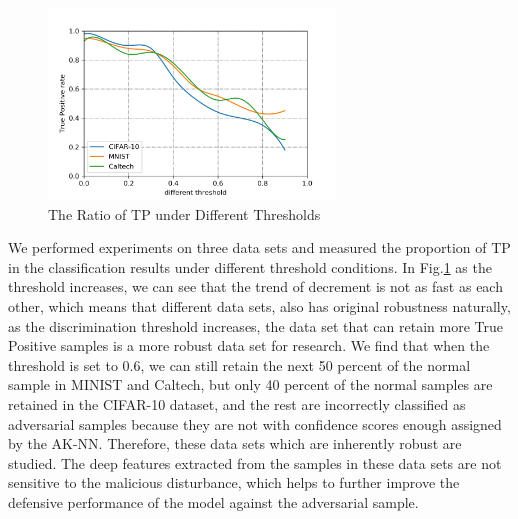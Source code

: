 \documentclass{ieeeaccess}
\begin{document}
\begin{figure}
	\centering
	\includegraphics[width=3in,height=2in]{fig//222.jpg}
	\caption{The Ratio of TP under Different Thresholds}
	\label{Differrnt dataset}
\end{figure}
We performed experiments on three data sets and measured the proportion of TP in the classification results under different threshold conditions. In Fig.\ref{Differrnt dataset} as the threshold increases, we can see that the trend of decrement is not as fast as each other, which means that different data sets, also has original robustness naturally, as the discrimination threshold increases, the data set that can retain more True Positive samples is a more robust data set for research. We find that when the threshold is set to 0.6, we can still retain the next 50 percent of the normal sample in MINIST and Caltech, but only 40 percent of the normal samples are retained in the CIFAR-10 dataset, and the rest are incorrectly classified as adversarial samples because they are not with confidence scores enough assigned by the AK-NN. Therefore, these data sets which are inherently robust are studied. The deep features extracted from the samples in these data sets are not sensitive to the malicious disturbance, which helps to further improve the defensive performance of the model against the adversarial sample.
\end{document}

